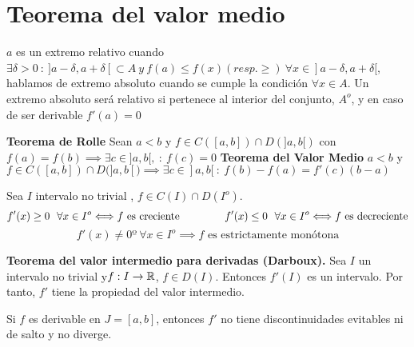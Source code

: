 \section{Teorema del valor medio}
$a$ es un extremo relativo cuando $\exists\delta>0 \ : \ ]a-\delta, a+\delta[\subset A \ y \  f(a)\leq f(x) (resp. \geq) \ \forall x\in ]a-\delta, a+\delta[$, hablamos de extremo absoluto cuando se cumple la condición $\forall x\in A$. Un extremo absoluto será relativo si pertenece al interior del conjunto, $A^o$, y en caso de ser derivable $f'(a) = 0$

\textbf{Teorema de Rolle}
Sean $a<b$ y $f\in C([a,b])\cap D(]a,b[)$ con $f(a) = f(b)\implies\exists c\in ]a,b[, \ : \ f(c) =0$
\textbf{Teorema del Valor Medio} 
$a<b$ y $f\in C([a,b])\cap D(]a,b[) \implies\exists c\in ]a, b[ \ : \ f(b)-f(a)=f'(c)(b-a)$

Sea $I$ intervalo no trivial
, $f\in C(I)\cap D(I^o)$.
$$ f'(x)\geq 0 \ \ \forall x\in I^o\Longleftrightarrow f \text{ es creciente} \hspace{1.5cm}
f'(x)\leq 0 \ \ \forall x\in I^o\Longleftrightarrow f \text{ es decreciente} $$
$$ f'(x)\not =0 º \ \forall x\in I^o \implies f \text{ es estrictamente monótona} $$

\textbf{Teorema del valor intermedio para derivadas (Darboux).} Sea $I$ un intervalo no trivial y$f:I\rightarrow\mathbb{R}$, $f\in D(I)$. Entonces $f'(I)$ es un intervalo. Por tanto, $f'$ tiene la propiedad del valor intermedio.

Si $f$ es derivable en $J=[a,b]$, entonces $f'$ no tiene discontinuidades evitables ni de salto y no diverge.